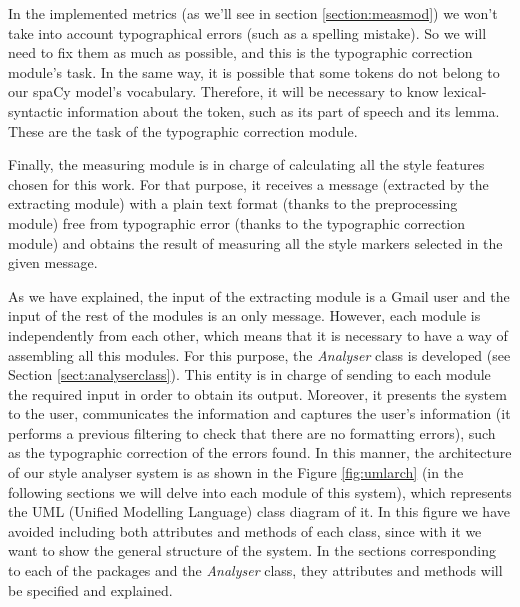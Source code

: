 In the implemented metrics (as we'll see in section \ref{section:measmod}) we won't take into account typographical errors (such as a spelling mistake). So we will need to fix them as much as possible, and this is the typographic correction module's task. In the same way, it is possible that some tokens do not belong to our spaCy model's vocabulary. Therefore, it will be necessary to know lexical-syntactic information about the token, such as its part of speech and its lemma. These are the task of the typographic correction module.

Finally, the measuring module is in charge of calculating all the style features chosen for this work. For that purpose, it receives a message (extracted by the extracting module) with a plain text format (thanks to the preprocessing module) free from typographic error (thanks to the typographic correction module) and obtains the result of measuring all the style markers selected in the given message.

As we have explained, the input of the extracting module is a Gmail user and the input of the rest of the modules is an only message. However, each module is independently from each other, which means that it is necessary to have a way of assembling all this modules. For this purpose, the \textit{Analyser} class is developed (see Section \ref{sect:analyserclass}). This entity is in charge of sending to each module the required input in order to obtain its output. Moreover, it presents the system to the user, communicates the information and captures the user's information (it performs a previous filtering to check that there are no formatting errors), such as the typographic correction of the errors found. In this manner, the architecture of our style analyser system is as shown in the Figure \ref{fig:umlarch} (in the following sections we will delve into each module of this system), which represents the UML (Unified Modelling Language) class diagram of it. In this figure we have avoided including both attributes and methods of each class, since with it we want to show the general structure of the system. In the sections corresponding to each of the packages and the \textit{Analyser} class, they attributes and methods will be specified and explained.

